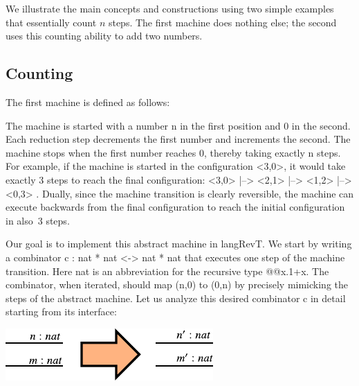 \documentclass{llncs}
\begin{document}
We illustrate the main concepts and constructions using two simple
examples that essentially count $n$ steps. The first machine does
nothing else; the second uses this counting ability to add two
numbers.

\subsection{Counting}

The first machine is defined as follows:

\vspace{-15pt}
\begin{multicols}{2}

\end{multicols}
\vspace{-15pt}
  
\noindent The machine is started with a number {{n}} in the first position
and {{0}} in the second. Each reduction step decrements the first number and
increments the second. The machine stops when the first number reaches 0,
thereby taking exactly {{n}} steps. For example, if the machine is started in
the configuration {{<3,0>}}, it would take exactly 3 steps to reach the final
configuration: {{ <3,0> |--> <2,1> |--> <1,2> |--> <0,3> }}. Dually, since
the machine transition is clearly reversible, the machine can execute
backwards from the final configuration to reach the initial configuration in
also~3 steps. 

Our goal is to implement this abstract machine in {{langRevT}}. We start by
writing a combinator {{c : nat * nat <-> nat * nat}} that executes one step
of the machine transition. Here {{nat}} is an abbreviation for the recursive
type {{@@x.1+x}}. The combinator, when iterated, should map {{(n,0)}} to
{{(0,n)}} by precisely mimicking the steps of the abstract machine. Let us
analyze this desired combinator {{c}} in detail starting from its interface:

\begin{center}
  \includegraphics{diagrams/nat-nat1.pdf}
\end{center}
\end{document}
